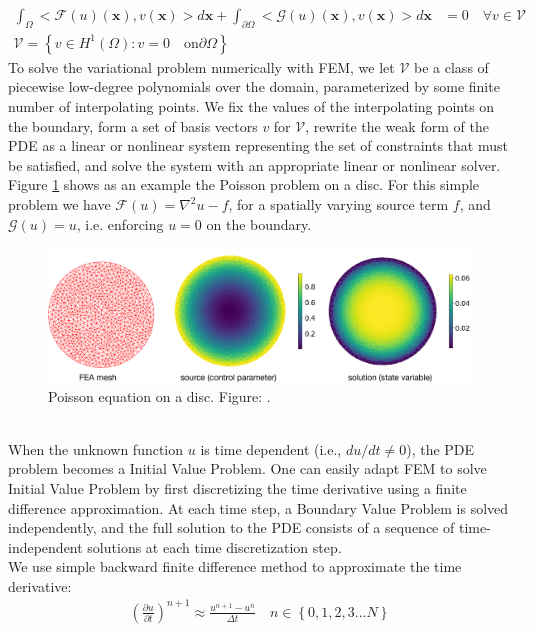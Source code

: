 \begin{align}
\int_{\Omega} <\mathcal{F}(u)(\bm{x}), v(\bm{x})> d\bm{x} + \int_{\partial \Omega} <\mathcal{G}(u)(\bm{x}), v(\bm{x})> d \bm{x} &= 0 \quad \forall v \in \mathcal{V} \label{eq:metapde-eakform} \\
\mathcal{V} = \left \lbrace v \in H^1(\Omega): v = 0 \quad \text{on} \partial \Omega \right\rbrace
\end{align}
To solve the variational problem numerically with FEM, we let $\mathcal{V}$ be a class of piecewise low-degree polynomials over the domain, parameterized by some finite number of interpolating points. We fix the values of the interpolating points on the boundary, form a set of basis vectors $v$ for $\mathcal{V}$, rewrite the weak form of the PDE as a linear or nonlinear system representing the set of constraints that must be satisfied, and solve the system with an appropriate linear or nonlinear solver.\\
Figure \ref{fig:metapde-poisson} shows as an example the Poisson problem on a disc. For this simple problem we have $\mathcal{F}(u) = \nabla^2 u - f$, for a spatially varying source term $f$, and $\mathcal{G}(u) = u$, i.e. enforcing $u=0$ on the boundary. 
\begin{figure}[t]
  \centering
\includegraphics[width=0.8\linewidth]{figures/poisson_equation.pdf}
\caption{Poisson equation on a disc.
Figure: \citet{xue2020amortized}.}%
\label{fig:metapde-poisson}%
\end{figure} \\
When the unknown function $u$ is time dependent (i.e., $du/dt \neq 0$), the PDE problem becomes a Initial Value Problem. One can easily adapt FEM to solve Initial Value Problem by first discretizing the time derivative using a finite difference approximation. At each time step, a Boundary Value Problem is solved independently, and the full solution to the PDE consists of a sequence of time-independent solutions at each time discretization step.\\
We use simple backward finite difference method to approximate the time derivative:
\begin{align}
    \left( \frac{\partial u}{\partial t}\right)^{n+1} \approx \frac{u^{n+1} - u^{n}}{\Delta t} \quad n \in \left \lbrace 0, 1,2,3...N\right\rbrace
\end{align}
